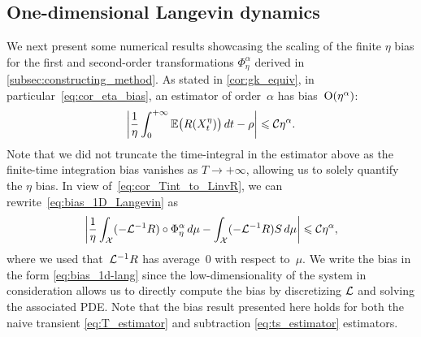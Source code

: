\subsection{One-dimensional Langevin dynamics}
\label{subsec:num_1D}
%
%
%
We next present some numerical results showcasing the scaling of the finite $\eta$ bias for the first and second-order transformations $\Phi_\eta^\alpha$ derived in \cref{subsec:constructing_method}. As stated in \cref{cor:gk_equiv}, in particular~\eqref{eq:cor_eta_bias}, an estimator of order~$\alpha$ has bias~$\mathrm{O}(\eta^\alpha)$: 
%
\begin{equation}
\label{eq:bias_1D_Langevin}
	\abs*{\frac{1}{\eta}\int_0^{+\infty} \E\bigl(R(X^\eta_t)\bigr) \, dt - \rho} \leq \mathcal{C}\eta^{\alpha}.
\end{equation}
%
Note that we did not truncate the time-integral in the estimator above as the finite-time integration bias vanishes as $T\to+\infty$, allowing us to solely quantify the $\eta$ bias. In view of~\eqref{eq:cor_Tint_to_LinvR}, we can rewrite~\eqref{eq:bias_1D_Langevin} as
%
\begin{equation}
    \abs*{\frac{1}{\eta}\int_\mathcal{X} (-\L^{-1}R) \circ \Phi_\eta^\alpha \, d\mu - \int_\mathcal{X} (-\L^{-1}R) S \, d\mu} \leq \mathcal{C}\eta^{\alpha},
    \label{eq:bias_1d-lang}
\end{equation}
%
where we used that~$\mathcal{L}^{-1}R$ has average~0 with respect to~$\mu$. We write the bias in the form \eqref{eq:bias_1d-lang} since the low-dimensionality of the system in consideration allows us to directly compute the bias by discretizing $\mathcal{L}$ and solving the associated PDE. %
Note that the bias result presented here holds for both the naive transient \eqref{eq:T_estimator} and subtraction \eqref{eq:ts_estimator} estimators.

